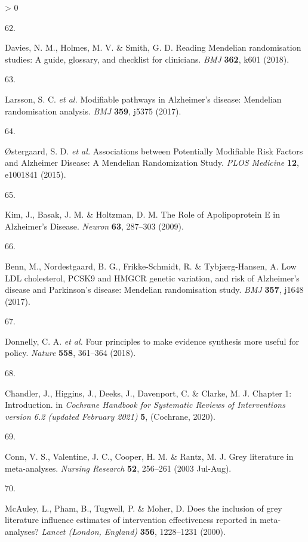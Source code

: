 \documentclass[a4paper, twoside]{templates/ociamthesis}
\newlength{\cslhangindent}
\newlength{\csllabelwidth}
\newenvironment{CSLReferences}[3] %
 {%
  \setlength{\parindent}{0pt}
  \ifodd #1 \everypar{\setlength{\hangindent}{\cslhangindent}}\ignorespaces\fi
  \ifnum #2 > 0
  \setlength{\parskip}{#2\baselineskip}
  \fi
 }%
 {}
\newcommand{\CSLLeftMargin}[1]{\parbox[t]{\maxof{\widthof{#1}}{\csllabelwidth}}{#1}}
\newcommand{\CSLRightInline}[1]{\parbox[t]{\linewidth - \csllabelwidth}{#1}}
\begin{document}
\begin{CSLReferences}{0}{0}
\leavevmode\hypertarget{ref-davies2018}{}%
\CSLLeftMargin{62. }
\CSLRightInline{Davies, N. M., Holmes, M. V. \& Smith, G. D. Reading {Mendelian} randomisation studies: A guide, glossary, and checklist for clinicians. \emph{BMJ} \textbf{362}, k601 (2018).}

\leavevmode\hypertarget{ref-larsson2017c}{}%
\CSLLeftMargin{63. }
\CSLRightInline{Larsson, S. C. \emph{et al.} Modifiable pathways in {Alzheimer}'s disease: {Mendelian} randomisation analysis. \emph{BMJ} \textbf{359}, j5375 (2017).}

\leavevmode\hypertarget{ref-ostergaard2015}{}%
\CSLLeftMargin{64. }
\CSLRightInline{Østergaard, S. D. \emph{et al.} Associations between {Potentially Modifiable Risk Factors} and {Alzheimer Disease}: {A Mendelian Randomization Study}. \emph{PLOS Medicine} \textbf{12}, e1001841 (2015).}

\leavevmode\hypertarget{ref-kim2009}{}%
\CSLLeftMargin{65. }
\CSLRightInline{Kim, J., Basak, J. M. \& Holtzman, D. M. The {Role} of {Apolipoprotein E} in {Alzheimer}'s {Disease}. \emph{Neuron} \textbf{63}, 287--303 (2009).}

\leavevmode\hypertarget{ref-benn2017}{}%
\CSLLeftMargin{66. }
\CSLRightInline{Benn, M., Nordestgaard, B. G., Frikke-Schmidt, R. \& Tybjærg-Hansen, A. Low {LDL} cholesterol, {PCSK9} and {HMGCR} genetic variation, and risk of {Alzheimer}'s disease and {Parkinson}'s disease: {Mendelian} randomisation study. \emph{BMJ} \textbf{357}, j1648 (2017).}

\leavevmode\hypertarget{ref-donnelly2018a}{}%
\CSLLeftMargin{67. }
\CSLRightInline{Donnelly, C. A. \emph{et al.} Four principles to make evidence synthesis more useful for policy. \emph{Nature} \textbf{558}, 361--364 (2018).}

\leavevmode\hypertarget{ref-chandler2019chapter}{}%
\CSLLeftMargin{68. }
\CSLRightInline{Chandler, J., Higgins, J., Deeks, J., Davenport, C. \& Clarke, M. J. Chapter 1: {Introduction}. in \emph{Cochrane {Handbook} for {Systematic Reviews} of {Interventions} version 6.2 (updated {February} 2021)} \textbf{5}, ({Cochrane}, 2020).}

\leavevmode\hypertarget{ref-conn2003}{}%
\CSLLeftMargin{69. }
\CSLRightInline{Conn, V. S., Valentine, J. C., Cooper, H. M. \& Rantz, M. J. Grey literature in meta-analyses. \emph{Nursing Research} \textbf{52}, 256--261 (2003 Jul-Aug).}

\leavevmode\hypertarget{ref-mcauley2000}{}%
\CSLLeftMargin{70. }
\CSLRightInline{McAuley, L., Pham, B., Tugwell, P. \& Moher, D. Does the inclusion of grey literature influence estimates of intervention effectiveness reported in meta-analyses? \emph{Lancet (London, England)} \textbf{356}, 1228--1231 (2000).}


\end{CSLReferences}
\end{document}
